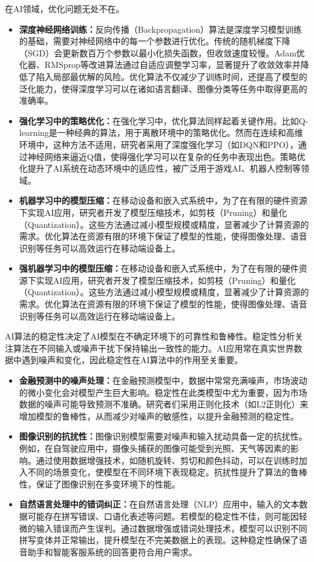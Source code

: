  在AI领域，优化问题无处不在。
 \begin{itemize}
\item {\bf 深度神经网络训练：}反向传播（Backpropagation）算法是深度学习模型训练的基础，需要对神经网络中的每一个参数进行优化。传统的随机梯度下降（SGD）会更新数百万个参数以最小化损失函数，但收敛速度较慢。Adam优化器、RMSprop等改进算法通过自适应调整学习率，显著提升了收敛效率并降低了陷入局部最优解的风险。优化算法不仅减少了训练时间，还提高了模型的泛化能力，使得深度学习可以在诸如语言翻译、图像分类等任务中取得更高的准确率。
\item {\bf 强化学习中的策略优化：}在强化学习中，优化算法同样起着关键作用。比如Q-learning是一种经典的算法，用于离散环境中的策略优化。然而在连续和高维环境中，这种方法不适用，研究者采用了深度强化学习（如DQN和PPO），通过神经网络来逼近Q值，使得强化学习可以在复杂的任务中表现出色。策略优化提升了AI系统在动态环境中的适应性，被广泛用于游戏AI、机器人控制等领域。
\item {\bf 机器学习中的模型压缩：}在移动设备和嵌入式系统中，为了在有限的硬件资源下实现AI应用，研究者开发了模型压缩技术，如剪枝（Pruning）和量化（Quantization）。这些方法通过减小模型规模或精度，显著减少了计算资源的需求。优化算法在资源有限的环境下保证了模型的性能，使得图像处理、语音识别等任务可以高效运行在移动端设备上。
\item {\bf 强机器学习中的模型压缩：}在移动设备和嵌入式系统中，为了在有限的硬件资源下实现AI应用，研究者开发了模型压缩技术，如剪枝（Pruning）和量化（Quantization）。这些方法通过减小模型规模或精度，显著减少了计算资源的需求。优化算法在资源有限的环境下保证了模型的性能，使得图像处理、语音识别等任务可以高效运行在移动端设备上。
\end{itemize}
AI算法的稳定性决定了AI模型在不确定环境下的可靠性和鲁棒性。稳定性分析关注算法在不同输入或噪声干扰下保持输出一致性的能力。AI应用常在真实世界数据中遇到噪声和变化，因此稳定性在AI算法中的作用至关重要。
\begin{itemize}
\item {\bf 金融预测中的噪声处理：}在金融预测模型中，数据中常常充满噪声，市场波动的微小变化会对模型产生巨大影响。稳定性在此类模型中尤为重要，因为市场数据的噪声可能导致预测不准确。研究者们采用正则化技术（如L2正则化）来增加模型的鲁棒性，从而减少对噪声的敏感性，以提升金融预测的稳定性。
\item {\bf 图像识别的抗扰性：}图像识别模型需要对噪声和输入扰动具备一定的抗扰性。例如，在自驾驶应用中，摄像头捕获的图像可能受到光照、天气等因素的影响。通过使用数据增强技术，如随机旋转、剪切和颜色抖动，可以在训练时加入不同的场景变化，使模型在不同环境下表现稳定。抗扰性提升了算法的鲁棒性，保证了图像识别在多变环境下的性能。
\item {\bf 自然语言处理中的错词纠正：}在自然语言处理（NLP）应用中，输入的文本数据可能存在拼写错误、口语化表述等问题。若模型的稳定性不佳，则可能因轻微的输入错误而产生误判。通过数据增强或错词处理技术，模型可以识别不同拼写变体并正常输出，提升模型在不完美数据上的表现。这种稳定性确保了语音助手和智能客服系统的回答更符合用户需求。
\end{itemize}
